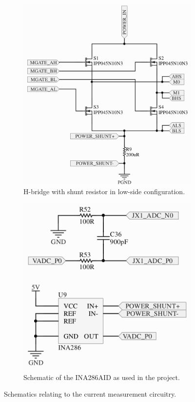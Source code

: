 \begin{figure}
	\centering
	\begin{subfigure}[b]{0.49\textwidth}
		\centering
		\includegraphics[width=\linewidth]{graphics/hbridge}
		\caption{H-bridge with shunt resistor in low-side configuration.}
		\label{sfig:hbridgeshunt}	
	\end{subfigure}
	\begin{subfigure}[b]{0.49\textwidth}
		\centering
		\includegraphics[width=\linewidth]{graphics/ina286}
		\caption{Schematic of the INA286AID as used in the project.}
		\label{sfig:ina286aidschematic}
	\end{subfigure}
	\caption{Schematics relating to the current measurement circuitry.}
	\label{fig:currentmeasure}
\end{figure}

